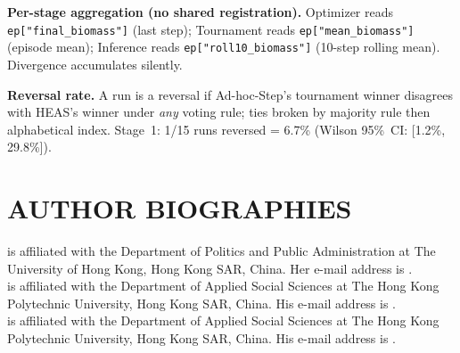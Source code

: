 \documentclass{wscpaperproc}
\begin{document}
\textbf{Per-stage aggregation (no shared registration).} Optimizer reads
\texttt{ep["final\_biomass"]} (last step); Tournament reads
\texttt{ep["mean\_biomass"]} (episode mean); Inference reads
\texttt{ep["roll10\_biomass"]} (10-step rolling mean). Divergence accumulates silently.

\textbf{Reversal rate.} A run is a reversal if Ad-hoc-Step's tournament
winner disagrees with HEAS's winner under \emph{any} voting rule; ties
broken by majority rule then alphabetical index. Stage~1: 1/15 runs
reversed = 6.7\% (Wilson 95\%~CI: [1.2\%, 29.8\%]).

\begingroup
\small


\endgroup

\section*{AUTHOR BIOGRAPHIES}

 is affiliated with the Department of Politics and Public Administration at The University of Hong Kong, Hong Kong SAR, China. Her e-mail address is .\\

 is affiliated with the Department of Applied Social Sciences at The Hong Kong Polytechnic University, Hong Kong SAR, China. His e-mail address is .\\

 is affiliated with the Department of Applied Social Sciences at The Hong Kong Polytechnic University, Hong Kong SAR, China. His e-mail address is .
\end{document}
